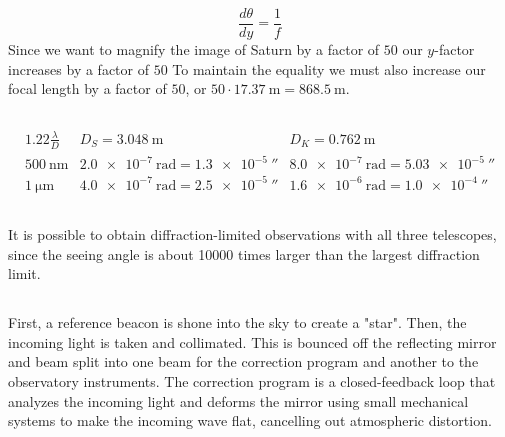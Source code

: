 \documentclass{article}
\begin{document}
\begin{equation}
    \frac{d\theta}{dy} = \frac{1}{f}
\end{equation}
Since we want to magnify the image of Saturn by a factor of \(50\) our \(y\)-factor increases by a factor of \(50\)
To maintain the equality we must also increase our focal length by a factor of \(50\), or \(50 \cdot \SI{17.37}{\meter} =\SI{868.5}{\meter}\).

\subsection{}

\begin{equation}
    \begin{array}{c|c|c}
        1.22 \frac{\lambda}{D} & D_S = \SI{3.048}{\meter} & D_K = \SI{0.762}{\meter} \\
        \hline
        \SI{500}{\nano\meter} & \SI{2.0e-7}{\radian} = \SI{1.3e-5}{\arcsecond} & \SI{8.0e-7}{\radian} = \SI{5.03e-5}{\arcsecond} \\
        \hline
        \SI{1}{\micro\meter} & \SI{4.0e-7}{\radian} = \SI{2.5e-5}{\arcsecond} & \SI{1.6e-6}{\radian} = \SI{1.0e-4}{\arcsecond}
    \end{array}
\end{equation}

\subsection{}

It is possible to obtain diffraction-limited observations with all three telescopes, since the seeing angle is about \num{10000} times larger than the largest diffraction limit.

\subsection{}

First, a reference beacon is shone into the sky to create a "star".
Then, the incoming light is taken and collimated.
This is bounced off the reflecting mirror and beam split into one beam for the correction program and another to the observatory instruments.
The correction program is a closed-feedback loop that analyzes the incoming light and deforms the mirror using small mechanical systems to make the incoming wave flat, cancelling out atmospheric distortion.

\subsection{}
\end{document}
